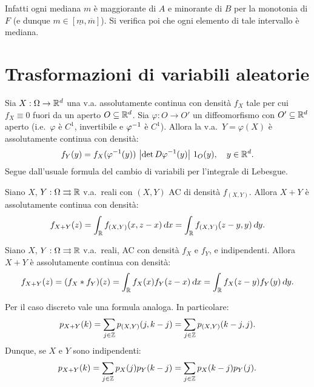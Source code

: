 \begin{multicols*}{2}
\begin{proposition}
    
    Infatti ogni mediana $m$ è maggiorante di $A$ e minorante di $B$ per la monotonia di
    $F$ (e dunque $m \in [\underline{m}, \overline{m}]$). Si verifica poi che ogni elemento
    di tale intervallo è mediana.
\end{proposition}

\section{Trasformazioni di variabili aleatorie}

\begin{proposition} Sia $X : \Omega \to \mathbb{R}^d$ una v.a. assolutamente
    continua con densità $f_X$ tale per cui $f_X \equiv 0$ fuori da un aperto $O \subseteq \mathbb{R}^d$. Sia
    $\varphi : O \to O'$ un diffeomorfismo con $O' \subseteq \mathbb{R}^d$ aperto (i.e.~$\varphi$ è $C^1$, invertibile e
    $\varphi^{-1}$ è $C^1$). Allora la v.a.~$Y = \varphi(X)$ è assolutamente continua con densità:
    \[
        f_Y(y) = f_X(\varphi^{-1}(y)) \, \left\lvert \det D\varphi^{-1}(y) \right\rvert \, 1_O(y), \quad y \in \mathbb{R}^d.
    \]
    Segue dall'usuale formula del cambio di variabili per l'integrale di Lebesgue.
\end{proposition}

\begin{proposition}
    Siano $X$, $Y : \Omega \rightrightarrows \mathbb{R}$ v.a.~reali con $(X, Y)$ AC di densità $f_{(X, Y)}$. Allora
    $X+Y$ è assolutamente continua con densità:
    \[
        f_{X+Y}(z) = \int_\RR f_{(X, Y)}(x, z-x) \dx = \int_\RR f_{(X, Y)}(z-y, y) \dy.
    \]
\end{proposition}

\begin{corollary}
    Siano $X$, $Y : \Omega \rightrightarrows \mathbb{R}$ v.a.~reali, AC con densità $f_X$ e $f_Y$, e indipendenti. Allora
    $X+Y$ è assolutamente continua con densità:
    \[
        f_{X+Y}(z) = (f_X * f_Y)(z) = \int_\RR f_X(x) f_Y(z-x) \dx = \int_\RR f_X(z-y) f_Y(y) \dy.
    \]
\end{corollary}

\begin{remark}
    Per il caso discreto vale una formula analoga. In particolare:
    \[
        p_{X+Y}(k) = \sum_{j \in \mathbb{Z}} p_{(X,Y)}(j, k-j) = \sum_{j \in \mathbb{Z}} p_{(X,Y)}(k-j, j).
    \]
    Dunque, se $X$ e $Y$ sono indipendenti:
    \[
        p_{X+Y}(k) = \sum_{j \in \mathbb{Z}} p_X(j) p_Y(k-j) = \sum_{j \in \mathbb{Z}} p_X(k-j) p_Y(j).
    \]
\end{remark}


\end{multicols*}
